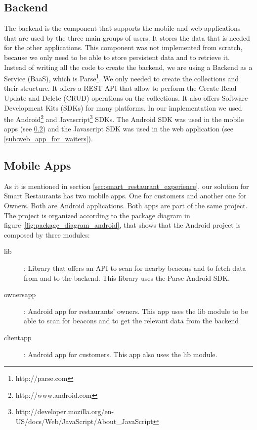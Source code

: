 \subsection{Backend}
\label{sub:backend}
The backend is the component that supports the mobile and web applications
that are used by the three main groups of users. It stores the data that is
needed for the other applications. This component was not implemented from
scratch, because we only need to be able to store persistent data and to
retrieve it. Instead of writing all the code to create the backend, we
are using a Backend as a Service (BaaS), which is Parse\footnote{http://parse.com}.
We only needed to create the collections and their structure.
It offers a REST API\cite{restful} that allow to perform the
Create Read Update and Delete (CRUD) operations
on the collections.
It also offers Software Development Kits (SDKs) for many platforms.
In our implementation we used the
Android\footnote{http://www.android.com} and
Javascript\footnote{http://developer.mozilla.org/en-US/docs/Web/JavaScript/About\_JavaScript}
SDKs. The Android SDK was used in the mobile apps (see \ref{sub:mobile_apps})
and the Javascript SDK was used in the web application
(see \ref{sub:web_app_for_waiters}).

\subsection{Mobile Apps}
\label{sub:mobile_apps}
As it is mentioned in section \ref{sec:smart_restaurant_experience}, our
solution for Smart Restaurants has two mobile apps. One for customers and
another one for Owners. Both are Android applications. Both apps are
part of the same project. The project is organized according to the
package diagram in figure~\ref{fig:package_diagram_android}, that shows
that the Android project is composed by three modules:
\begin{description}
  \item[lib]: Library that offers an API to scan for nearby beacons and
  to fetch data from and to the backend. This library uses the Parse Android
  SDK.
  \item[ownersapp]: Android app for restaurants' owners. This app uses
  the lib module to be able to scan for beacons and to get the relevant
  data from the backend
  \item[clientapp]: Android app for customers. This app also uses the lib
  module.
\end{description}

